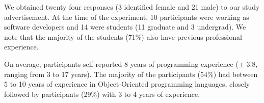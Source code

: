 We obtained twenty four responses (3 identified female and 21 male) to our study advertisement. 
At the time of the experiment, 10 participants were working as software
developers and 14 were students (11 graduate and 3 undergrad).
We note that the majority of the students (71\%) also have previous professional experience.


On average, participants self-reported 8 years of programming experience ({\small $\pm$} 3.8, ranging from 3 to 17 years).
The majority of the participants (54\%) had between 5 to 10 years of experience in Object-Oriented programming languages,
closely followed by participants (29\%) with  3 to 4 years of experience.

